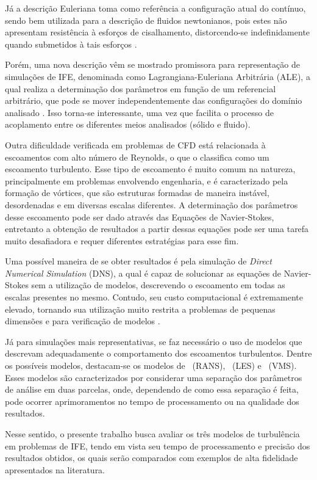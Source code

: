 Já a descrição Euleriana toma como referência a configuração atual do contínuo, sendo bem utilizada para a descrição de fluidos newtonianos, pois estes não apresentam resistência à esforços de cisalhamento, distorcendo-se indefinidamente quando submetidos à tais esforços \cite{sanches2014fluid, fernandes2019ale}.

Porém, uma nova descrição vêm se mostrado promissora para representação de simulações de IFE, denominada como Lagrangiana-Euleriana Arbitrária (ALE), a qual realiza a determinação dos parâmetros em função de um referencial arbitrário, que pode se mover independentemente das configurações do domínio analisado \cite{donea1982arbitrary}. Isso torna-se interessante, uma vez que facilita o processo de acoplamento entre os diferentes meios analisados (sólido e fluido).

Outra dificuldade verificada em problemas de CFD está relacionada à escoamentos com alto número de Reynolds, o que o classifica como um escoamento turbulento. Esse tipo de escoamento é muito comum na natureza, principalmente em problemas envolvendo engenharia, e é caracterizado pela formação de vórtices, que são estruturas formadas de maneira instável, desordenadas e em diversas escalas diferentes. A determinação dos parâmetros desse escoamento pode ser dado através das Equações de Navier-Stokes, entretanto a obtenção de resultados a partir dessas equações pode ser uma tarefa muito desafiadora e requer diferentes estratégias para esse fim.

Uma possível maneira de se obter resultados é pela simulação de \textit{Direct Numerical Simulation} (DNS), a qual é capaz de solucionar as equações de Navier-Stokes sem a utilização de modelos, descrevendo o escoamento em todas as escalas presentes no mesmo. Contudo, seu custo computacional é extremamente elevado, tornando sua utilização muito restrita a problemas de pequenas dimensões e para verificação de modelos \cite{olad2022towards}.

Já para simulações mais representativas, se faz necessário o uso de modelos que descrevam adequadamente o comportamento dos escoamentos turbulentos. Dentre os possíveis modelos, destacam-se os modelos de \RANS\ (RANS), \LES\ (LES) e \VMS\ (VMS). Esses modelos são caracterizados por considerar uma separação dos parâmetros de análise em duas parcelas, onde, dependendo de como essa separação é feita, pode ocorrer aprimoramentos no tempo de processamento ou na qualidade dos resultados.

Nesse sentido, o presente trabalho busca avaliar os três modelos de turbulência em problemas de IFE, tendo em vista seu tempo de processamento e precisão dos resultados obtidos, os quais serão comparados com exemplos de alta fidelidade apresentados na literatura.

